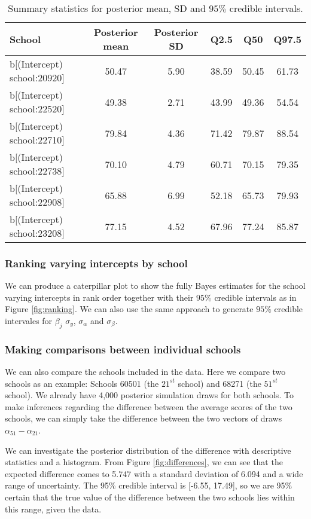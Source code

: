 \begin{table}[ht]
	\centering
	\def\arraystretch{1.3}
	{\small
		\begin{tabular}{l | c c c c c}
			School & Posterior mean & Posterior SD & Q2.5 & Q50 & Q97.5\\
			\hline
			b[(Intercept) school:20920] & 50.47 & 5.90 & 38.59 & 50.45 & 61.73 \\
			b[(Intercept) school:22520] & 49.38 & 2.71 & 43.99 & 49.36 & 54.54 \\
			b[(Intercept) school:22710] & 79.84 & 4.36 &  71.42 & 79.87 & 88.54 \\
			b[(Intercept) school:22738] & 70.10 & 4.79 & 60.71 & 70.15 & 79.35  \\
			b[(Intercept) school:22908] & 65.88 & 6.99 & 52.18 & 65.73 & 79.93 \\
			b[(Intercept) school:23208] &  77.15 & 4.52 & 67.96 & 77.24 & 85.87
		\end{tabular}
	}
	\caption{{\small Summary statistics for posterior mean, SD and $95\%$ credible intervals.}}
	\label{tab:summary_data}
\end{table}

\subsubsection{Ranking varying intercepts by school}

We can produce a caterpillar plot to show the fully Bayes estimates for the school varying intercepts in rank order together with their $95\%$ credible intervals as in Figure \ref{fig:ranking}. We can also use the same approach to generate $95\%$ credible intervales for $\beta_j$ $\sigma_y$, $\sigma_\alpha$ and $\sigma_\beta$.

\subsubsection{Making comparisons between individual schools}

We can also compare the schools included in the data.  Here we compare two schools as an example: Schools 60501 (the $21^{st}$ school) and 68271 (the $51^{st}$ school). We already have 4,000 posterior simulation draws for both schools. To make inferences regarding the difference between the average scores of the two schools, we can simply take the difference between the two vectors of draws $\alpha_{51} - \alpha_{21}$.

We can investigate the posterior distribution of the difference with descriptive statistics and a histogram. From Figure \ref{fig:differences}, we can see that the expected difference comes to 5.747 with a standard deviation of 6.094 and a wide range of uncertainty. The 95\% credible interval is [-6.55, 17.49], so we are 95\% certain that the true value of the difference between the two schools lies within this range, given the data.

